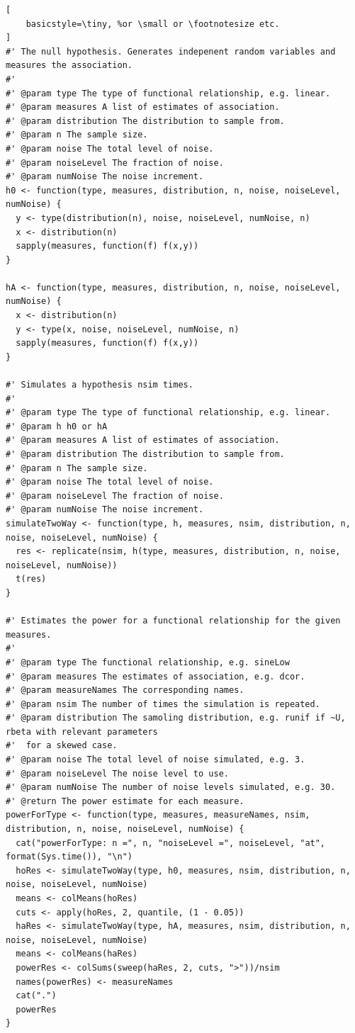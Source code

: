 \documentclass[a4paper, 12pt]{report}
\begin{document}
\begin{lstlisting}[
    basicstyle=\tiny, %or \small or \footnotesize etc.
]
#' The null hypothesis. Generates indepenent random variables and measures the association.
#'
#' @param type The type of functional relationship, e.g. linear.
#' @param measures A list of estimates of association.
#' @param distribution The distribution to sample from.
#' @param n The sample size.
#' @param noise The total level of noise.
#' @param noiseLevel The fraction of noise.
#' @param numNoise The noise increment.
h0 <- function(type, measures, distribution, n, noise, noiseLevel, numNoise) {
  y <- type(distribution(n), noise, noiseLevel, numNoise, n)
  x <- distribution(n)
  sapply(measures, function(f) f(x,y))
}

hA <- function(type, measures, distribution, n, noise, noiseLevel, numNoise) {
  x <- distribution(n)
  y <- type(x, noise, noiseLevel, numNoise, n)
  sapply(measures, function(f) f(x,y))
}

#' Simulates a hypothesis nsim times.
#'
#' @param type The type of functional relationship, e.g. linear.
#' @param h h0 or hA
#' @param measures A list of estimates of association.
#' @param distribution The distribution to sample from.
#' @param n The sample size.
#' @param noise The total level of noise.
#' @param noiseLevel The fraction of noise.
#' @param numNoise The noise increment.
simulateTwoWay <- function(type, h, measures, nsim, distribution, n, noise, noiseLevel, numNoise) {
  res <- replicate(nsim, h(type, measures, distribution, n, noise, noiseLevel, numNoise))
  t(res)
}

#' Estimates the power for a functional relationship for the given measures.
#'
#' @param type The functional relationship, e.g. sineLow
#' @param measures The estimates of association, e.g. dcor.
#' @param measureNames The corresponding names.
#' @param nsim The number of times the simulation is repeated.
#' @param distribution The samoling distribution, e.g. runif if ~U, rbeta with relevant parameters 
#'  for a skewed case. 
#' @param noise The total level of noise simulated, e.g. 3.
#' @param noiseLevel The noise level to use.
#' @param numNoise The number of noise levels simulated, e.g. 30. 
#' @return The power estimate for each measure.
powerForType <- function(type, measures, measureNames, nsim, distribution, n, noise, noiseLevel, numNoise) {
  cat("powerForType: n =", n, "noiseLevel =", noiseLevel, "at", format(Sys.time()), "\n")
  hoRes <- simulateTwoWay(type, h0, measures, nsim, distribution, n, noise, noiseLevel, numNoise)
  means <- colMeans(hoRes)
  cuts <- apply(hoRes, 2, quantile, (1 - 0.05))
  haRes <- simulateTwoWay(type, hA, measures, nsim, distribution, n, noise, noiseLevel, numNoise)
  means <- colMeans(haRes)
  powerRes <- colSums(sweep(haRes, 2, cuts, ">"))/nsim
  names(powerRes) <- measureNames
  cat(".")
  powerRes
}


\end{lstlisting}
\end{document}
